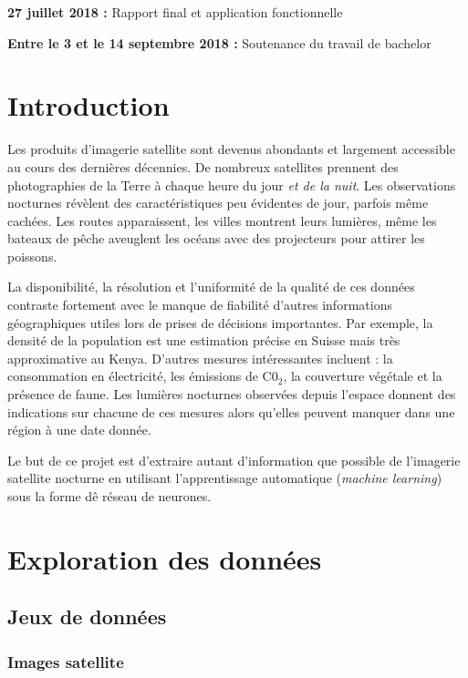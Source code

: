 \documentclass[a4paper, 11pt]{report}
\begin{document}
\textbf{27 juillet 2018 :} Rapport final et application fonctionnelle

\textbf{Entre le 3 et le 14 septembre 2018 :} Soutenance du travail de bachelor



\chapter{Introduction}
Les produits d'imagerie satellite sont devenus abondants et largement accessible au cours des dernières décennies. De nombreux satellites prennent des photographies de la Terre à chaque heure du jour \textit{et de la nuit}. Les observations nocturnes révèlent des caractéristiques peu évidentes de jour, parfois même cachées. Les routes apparaissent, les villes montrent leurs lumières, même les bateaux de pêche aveuglent les océans avec des projecteurs pour attirer les poissons.

La disponibilité, la résolution et l'uniformité de la qualité de ces données contraste fortement avec le manque de fiabilité d'autres informations géographiques utiles lors de prises de décisions importantes. Par exemple, la densité de la population est une estimation précise en Suisse mais très approximative au Kenya. D'autres mesures intéressantes incluent : la consommation en électricité, les émissions de C0$_2$, la couverture végétale et la présence de faune. Les lumières nocturnes observées depuis l'espace donnent des indications sur chacune de ces mesures alors qu'elles peuvent manquer dans une région à une date donnée.

Le but de ce projet est d'extraire autant d'information que possible de l'imagerie satellite nocturne en utilisant l'apprentissage automatique (\textit{machine learning}) sous la forme dê réseau de neurones.

\chapter{Exploration des données}
\section{Jeux de données}
\subsection{Images satellite}
\end{document}
